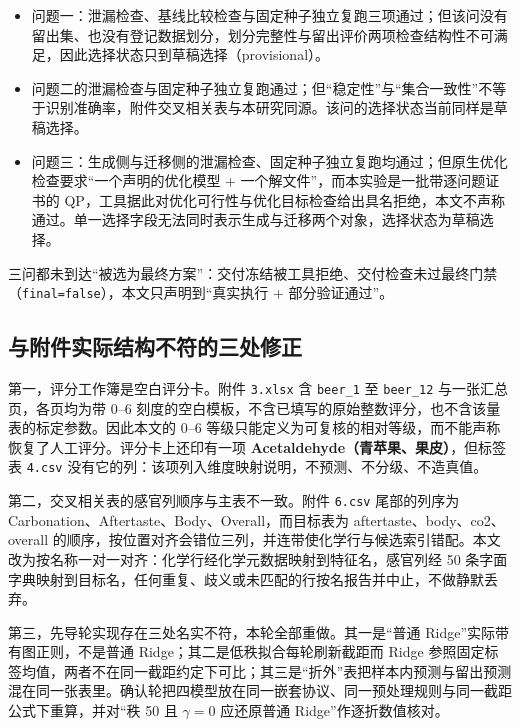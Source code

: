\documentclass[11pt,a4paper]{article}
\providecommand{\tightlist}{%
  \setlength{\itemsep}{0pt}\setlength{\parskip}{0pt}}
\begin{document}
\begin{itemize}
\tightlist
\item
  问题一：泄漏检查、基线比较检查与固定种子独立复跑三项通过；但该问没有留出集、也没有登记数据划分，划分完整性与留出评价两项检查结构性不可满足，因此选择状态只到草稿选择（provisional）。
\item
  问题二的泄漏检查与固定种子独立复跑通过；但``稳定性''与``集合一致性''不等于识别准确率，附件交叉相关表与本研究同源。该问的选择状态当前同样是草稿选择。
\item
  问题三：生成侧与迁移侧的泄漏检查、固定种子独立复跑均通过；但原生优化检查要求``一个声明的优化模型
  + 一个解文件''，而本实验是一批带逐问题证书的
  QP，工具据此对优化可行性与优化目标检查给出具名拒绝，本文不声称通过。单一选择字段无法同时表示生成与迁移两个对象，选择状态为草稿选择。
\end{itemize}

三问都未到达``被选为最终方案''：交付冻结被工具拒绝、交付检查未过最终门禁（\texttt{final=false}），本文只声明到``真实执行
+ 部分验证通过''。

\subsection{与附件实际结构不符的三处修正}\label{ux4e0eux9644ux4ef6ux5b9eux9645ux7ed3ux6784ux4e0dux7b26ux7684ux4e09ux5904ux4feeux6b63}

第一，评分工作簿是空白评分卡。附件 \texttt{3.xlsx} 含 \texttt{beer\_1}
至 \texttt{beer\_12} 与一张汇总页，各页均为带 0--6
刻度的空白模板，不含已填写的原始整数评分，也不含该量表的标定参数。因此本文的
0--6
等级只能定义为可复核的相对等级，而不能声称恢复了人工评分。评分卡上还印有一项
\textbf{Acetaldehyde（青苹果、果皮）}，但标签表 \texttt{4.csv}
没有它的列：该项列入维度映射说明，不预测、不分级、不造真值。

第二，交叉相关表的感官列顺序与主表不一致。附件 \texttt{6.csv}
尾部的列序为 Carbonation、Aftertaste、Body、Overall，而目标表为
aftertaste、body、co2、overall
的顺序，按位置对齐会错位三列，并连带使化学行与候选索引错配。本文改为按名称一对一对齐：化学行经化学元数据映射到特征名，感官列经
50
条字面字典映射到目标名，任何重复、歧义或未匹配的行按名报告并中止，不做静默丢弃。

第三，先导轮实现存在三处名实不符，本轮全部重做。其一是``普通
Ridge''实际带有图正则，不是普通 Ridge；其二是低秩拟合每轮刷新截距而
Ridge
参照固定标签均值，两者不在同一截距约定下可比；其三是``折外''表把样本内预测与留出预测混在同一张表里。确认轮把四模型放在同一嵌套协议、同一预处理规则与同一截距公式下重算，并对``秩
50 且 \(\gamma=0\) 应还原普通 Ridge''作逐折数值核对。
\end{document}
